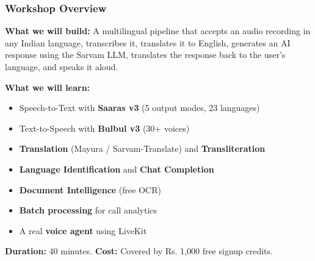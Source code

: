 
\begin{frame}[fragile]\frametitle{Workshop Overview}
\textbf{What we will build:} A multilingual pipeline that accepts an audio recording in any Indian language, transcribes it, translates it to English, generates an AI response using the Sarvam LLM, translates the response back to the user's language, and speaks it aloud.

\textbf{What we will learn:}
  \begin{itemize}
    \item Speech-to-Text with \textbf{Saaras v3} (5 output modes, 23 languages)
    \item Text-to-Speech with \textbf{Bulbul v3} (30+ voices)
    \item \textbf{Translation} (Mayura / Sarvam-Translate) and \textbf{Transliteration}
    \item \textbf{Language Identification} and \textbf{Chat Completion}
    \item \textbf{Document Intelligence} (free OCR)
    \item \textbf{Batch processing} for call analytics
    \item A real \textbf{voice agent} using LiveKit
  \end{itemize}
\textbf{Duration:} 40 minutes. \textbf{Cost:} Covered by Rs. 1,000 free signup credits.
\end{frame}

